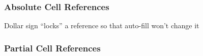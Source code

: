 \documentclass[color=usenames,dvipsnames]{beamer}\usepackage[]{graphicx}\usepackage[]{xcolor}
\begin{document}
\begin{frame}
  \frametitle{Absolute Cell References}
  \begin{center}
    Dollar sign ``locks'' a reference so that auto-fill won't change it
  \end{center}
\end{frame}


\begin{frame}
  \frametitle{Partial Cell References}
\end{frame}
\end{document}
